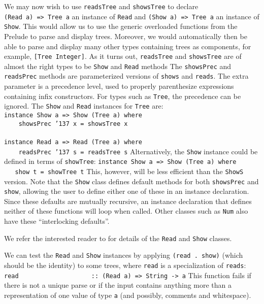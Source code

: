 We may now wish to use \mbox{\tt readsTree} and \mbox{\tt showsTree} to declare 
\mbox{\tt (Read\ a)\ =>\ Tree\ a} an instance of \mbox{\tt Read} and \mbox{\tt (Show\ a)\ =>\ Tree\ a} an
instance of \mbox{\tt Show}.  This would allow us to
use the generic overloaded functions from the Prelude to parse and
display trees.  Moreover, we would automatically then be able to parse
and display many other types containing trees as components, for
example, \mbox{\tt [Tree\ Integer]}.  As it turns out, \mbox{\tt readsTree} and \mbox{\tt showsTree}
are of almost the right types to be \mbox{\tt Show} and \mbox{\tt Read} methods
The \mbox{\tt showsPrec}
and \mbox{\tt readsPrec} methods are parameterized versions of \mbox{\tt shows} and
\mbox{\tt reads}.  The extra parameter is a precedence level, used to properly
parenthesize expressions containing infix constructors.  For types
such as \mbox{\tt Tree}, the precedence can be ignored.  The \mbox{\tt Show} and \mbox{\tt Read}
instances for \mbox{\tt Tree} are:
\bprog
\mbox{\tt instance\ Show\ a\ =>\ Show\ (Tree\ a)\ where}\\
\mbox{\tt \ \ \ \ showsPrec\ {\char'137}\ x\ =\ showsTree\ x}\\
\mbox{\tt }\\[-8pt]
\mbox{\tt instance\ Read\ a\ =>\ Read\ (Tree\ a)\ where}\\
\mbox{\tt \ \ \ \ readsPrec\ {\char'137}\ s\ =\ readsTree\ s}
\eprog
Alternatively, the \mbox{\tt Show} instance could be defined in terms of
\mbox{\tt showTree}: 
\bprog
\mbox{\tt instance\ Show\ a\ =>\ Show\ (Tree\ a)\ where}\\
\mbox{\tt \ \ \ show\ t\ =\ showTree\ t}
\eprog
This, however, will be less efficient than the \mbox{\tt ShowS} version.  Note
that the \mbox{\tt Show} class defines default methods for both \mbox{\tt showsPrec} and
\mbox{\tt show}, allowing the user to define either one of these in an instance
declaration.  Since these defaults are mutually recursive, an instance
declaration that defines neither of these functions will loop when
called.  Other classes such as \mbox{\tt Num} also have these ``interlocking
defaults''. 

We refer the interested reader to  for details
of the \mbox{\tt Read} and \mbox{\tt Show} classes.

We can test the \mbox{\tt Read} and \mbox{\tt Show} instances by applying \mbox{\tt (read\ .\ show)}
(which should be the identity) to some trees, where \mbox{\tt read} is a
specialization of \mbox{\tt reads}:
\bprog
\mbox{\tt read\ \ \ \ \ \ \ \ \ \ \ \ \ \ \ \ \ \ \ \ ::\ (Read\ a)\ =>\ String\ ->\ a}
\eprog
This function fails if there is not a unique parse or if the input
contains anything more than a representation of one value of type \mbox{\tt a}
(and possibly, comments and whitespace).

